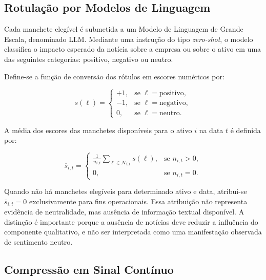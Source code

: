 \subsection{Rotulação por Modelos de Linguagem}
\label{subsec:rotulacao_llms}

Cada manchete elegível é submetida a um Modelo de Linguagem de Grande Escala, denominado LLM. Mediante uma instrução do tipo \textit{zero-shot}, o modelo classifica o impacto esperado da notícia sobre a empresa ou sobre o ativo em uma das seguintes categorias: positivo, negativo ou neutro.

Define-se a função de conversão dos rótulos em escores numéricos por:

\begin{equation}
    s(\ell)
    =
    \begin{cases}
        +1,
        & \text{se } \ell=\text{positivo},\\
        -1,
        & \text{se } \ell=\text{negativo},\\
        0,
        & \text{se } \ell=\text{neutro}.
    \end{cases}
    \label{eq:mapa_sentimento}
\end{equation}

A média dos escores das manchetes disponíveis para o ativo $i$ na data $t$ é definida por:

\begin{equation}
    \overline{s}_{i,t}
    =
    \begin{cases}
        \displaystyle
        \frac{1}{n_{i,t}}
        \sum_{\ell\in\mathcal{N}_{i,t}}
        s(\ell),
        & \text{se } n_{i,t}>0,\\[1.2em]
        0,
        & \text{se } n_{i,t}=0.
    \end{cases}
    \label{eq:media_sentimento}
\end{equation}

Quando não há manchetes elegíveis para determinado ativo e data, atribui-se $\overline{s}_{i,t}=0$ exclusivamente para fins operacionais. Essa atribuição não representa evidência de neutralidade, mas ausência de informação textual disponível. A distinção é importante porque a ausência de notícias deve reduzir a influência do componente qualitativo, e não ser interpretada como uma manifestação observada de sentimento neutro.

\subsection{Compressão em Sinal Contínuo}
\label{subsec:compressao_sinal}

